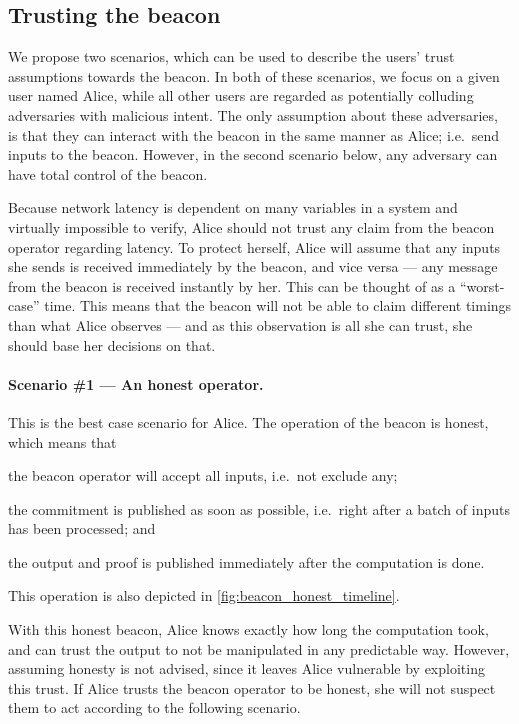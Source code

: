 \subsection{Trusting the beacon}%
\label{sub:trusting_the_beacon}

We propose two scenarios, which can be used to describe the users' trust assumptions towards the beacon.
In both of these scenarios, we focus on a given user named Alice, while all other users are regarded as potentially colluding adversaries with malicious intent.
The only assumption about these adversaries, is that they can interact with the beacon in the same manner as Alice; i.e.\ send inputs to the beacon.
However, in the second scenario below, any adversary can have total control of the beacon.

Because network latency is dependent on many variables in a system and virtually impossible to verify, Alice should not trust any claim from the beacon operator regarding latency.
To protect herself, Alice will assume that any inputs she sends is received immediately by the beacon, and vice versa --- any message from the beacon is received instantly by her. This can be thought of as a \enquote{worst-case} time.
This means that the beacon will not be able to claim different timings than what Alice observes --- and as this observation is all she can trust, she should base her decisions on that.

\paragraph{Scenario \#1 --- An honest operator.}
This is the best case scenario for Alice.
The operation of the beacon is honest, which means that
\begin{eletterate*}
\item the beacon operator will accept all inputs, i.e.\ not exclude any;
\item the commitment is published as soon as possible, i.e.\ right after a batch of inputs has been processed; and
\item the output and proof is published immediately after the computation is done.
\end{eletterate*}
This operation is also depicted in \cref{fig:beacon_honest_timeline}.

With this honest beacon, Alice knows exactly how long the computation took, and can trust the output to not be manipulated in any predictable way.
However, assuming honesty is not advised, since it leaves Alice vulnerable by exploiting this trust.
If Alice trusts the beacon operator to be honest, she will not suspect them to act according to the following scenario.

